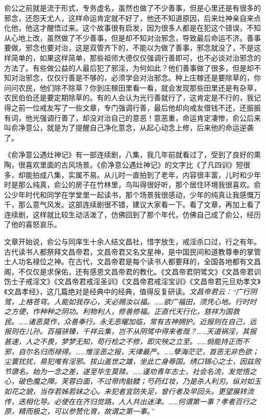 俞公之前就是流于形式，专务虚名，虽然也做了不少善事，但是心里还是有很多的邪念，还怨天尤人，这样命运肯定就不好了，他还不知道原因，后来灶神亲自来点化他，他这才醒悟过来。这个故事很有启发，因为很多人都是在犯这个错误，不知从心地上改，虽然做了不少善事，但是却不知对治邪念，导致最后命运不济。善事要做，邪念也要对治，这是双管齐下的，不能以为做了善事，邪念就没了，不是这样简单的，如果这样简单，那些祖师大德仅仅强调行善即可，也不必谈对治邪念的方法了。有些做公益的人最后犯了邪淫，为何如此？他们善事做了很多，但是却不知对治邪念，仅仅行善是不够的，必须学会对治邪念。种上庄稼还是要除草的，你问问农民，他们除不除草？你到庄稼田里看一看，就会发现那些田里还是有杂草，农民伯伯还是要定期除草的。有的人会认为光行善就行了，这肯定是不行的，我记得之前一位戒友写了一些文章，专门强调行善，最后他却向戒友借钱不还，还振振有词，他光强调行善了，却没对治自己的意恶！意恶重，命运肯定凄惨，俞公后来叫俞净意公，就是为了提醒自己净化意念，从起心动念上修，后来他的命运逆袭了。

《俞净意公遇灶神记》有一部连续剧，八集，我几年前就看过了，受到了良好的熏陶，很喜欢里面的古风场景。《俞净意公遇灶神记》的文字比《了凡四训》短很多，却能拍成八集，实属不易。从儿时一直拍到了老年，内容很丰富，儿时和少年时是那么纯真，俞公的房子在竹林里，鸟叫得很好听，那个居住环境我很喜欢。俞公少年时代和同学在学堂里一起读书，那个场景我很感动，少年的纯真让我感慨万千，那么意气风发。这部连续剧很不错，建议大家看一下。看了文章，再加上看了连续剧，这样就比较生动活泼了，仿佛回到了那个年代，仿佛自己成了俞公，经历了他的喜怒哀乐。

文章开始说，俞公与同庠生十余人结文昌社，惜字放生，戒淫杀口过，行之有年。古代读书人都祭拜文昌帝君，文昌帝君又名文星神，是中国民间和道教尊奉的掌管士人功名禄位之神。在古代，文昌帝君是每个读书人都要拜的，全国各地都有文昌阁，不仅仅是求保佑，还有感恩文昌帝君的教化。《文昌帝君阴骘文》《文昌帝君训饬士子戒淫文》《文昌帝君戒淫圣训》《文昌帝君戒淫宝训》《文昌帝君元旦劝孝文》《文昌孝经》，这几篇绝对是经典中的经典，值得反复研读。\textit{文昌帝君云：“广行阴骘，上格苍穹。人能如我存心，天必赐汝以福。……欲广福田，须凭心地。行时时之方便，作种种之阴功。利物利人，修善修福。正直代天行化，慈祥为国救民。……诸恶莫作，众善奉行。永无恶曜加临，常有吉神拥护。近报则在自己，远报则在儿孙。百福骈臻，千祥云集，岂不从阴骘中得来者哉？……天道祸淫，其报甚速，人之不畏，梦梦无知，苟行检之不修，即灾殃之立至。……倘能持正而不邪，自尔名归而禄得。……惟淫恶之报，天律最严。……孽海茫茫，首恶无非色欲；尘寰扰扰，易犯唯有淫邪。拔山盖世之雄，坐此亡身辱国。绣口锦心之士，因兹败节隳名。始为一念之差，遂至毕生莫赎。……谨劝青年志士，社会名流，发觉悟之心，破色魔之障。芙蓉白面，不过带肉骷髅；芍药红妆，乃是杀人利刃。纵对如玉如花之貌，当存若姊若妹之心。未犯者宜防失足，曾行者及早回头。更望展转流传，迭相化导。必使在在齐归觉路，人人共出迷津。……何谓第一事？孝者百行之原，精而极之，可以参赞化育，故谓之第一事。”}

